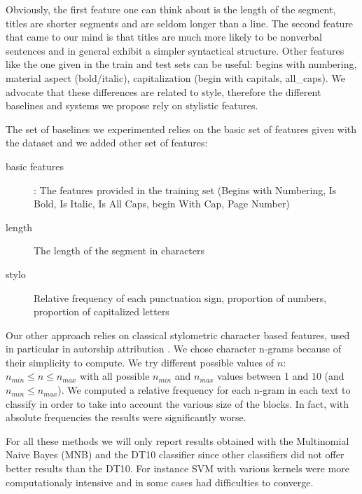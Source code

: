 
 
Obviously, the first feature one can think about is the length of the segment, titles are shorter segments and are seldom longer than a line. %
 The second feature that came to our mind is that titles are much more likely to be nonverbal sentences and in general exhibit a simpler syntactical structure.
Other features like the one given in the train and test sets can be useful: begins with numbering, material aspect (bold/italic), capitalization (begin with capitals, all\_caps). 
 We advocate that these differences are related to style, therefore the different baselines and systems we propose rely on stylistic features.
 
 The set of baselines we experimented relies on the basic set of features given with the dataset and we added other set of features:
  
  \begin{description}
\item[basic features]: The features provided in the training set (Begins with Numbering, Is Bold, Is Italic, Is All Caps, begin With Cap, Page Number)
\item[length] The length of the segment in characters
\item[stylo] Relative frequency of each punctuation sign, proportion of numbers, proportion of capitalized letters
  \end{description}
  
   Our other approach relies on classical stylometric character based features, used in particular in autorship attribution \cite{Brixtel-2015}. We chose character n-grams because of their simplicity to compute. We try different possible values of $n$: $n_{min} \leq n \leq n_{max}$ with all possible $n_{min}$ and $n_{max}$ values between 1 and 10 (and $n_{min}\leq n_{max}$).
   We computed a relative frequency for each n-gram in each text to classify in order to take into account the various size of the blocks. In fact, with absolute frequencies the results were significantly worse.
  
For all these methods we will only report results obtained with the Multinomial Naive Bayes (MNB) and the DT10 classifier since other classifiers did not offer better results than the DT10. For instance SVM with various kernels were more computationaly intensive and in some cases had difficulties to converge.
  
